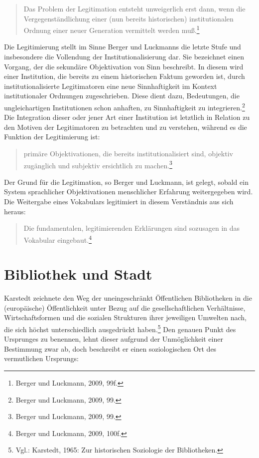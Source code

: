 \documentclass[a4paper,
fontsize=11pt,
oneside,
numbers=noperiodatend,
parskip=half-,
bibliography=totoc,
final
]{scrartcl}
\begin{document}
\begin{quote}
Das Problem der Legitimation entsteht unweigerlich erst dann, wenn die
Vergegenständlichung einer (nun bereits historischen) institutionalen
Ordnung einer neuer Generation vermittelt werden muß.\footnote{Berger
  und Luckmann, 2009, 99f.}
\end{quote}

Die Legitimierung stellt im Sinne Berger und Luckmanns die letzte Stufe
und insbesondere die Vollendung der Institutionalisierung dar. Sie
bezeichnet einen Vorgang, der die sekundäre Objektivation von Sinn
beschreibt. In diesem wird einer Institution, die bereits zu einem
historischen Faktum geworden ist, durch institutionalisierte
Legitimatoren eine neue Sinnhaftigkeit im Kontext institutionaler
Ordnungen zugeschrieben. Diese dient dazu, Bedeutungen, die
ungleichartigen Institutionen schon anhaften, zu Sinnhaftigkeit zu
integrieren.\footnote{Berger und Luckmann, 2009, 99.} Die Integration
dieser oder jener Art einer Institution ist letztlich in Relation zu den
Motiven der Legitimatoren zu betrachten und zu verstehen, während es die
Funktion der Legitimierung ist:

\begin{quote}
primäre Objektivationen, die bereits institutionalisiert sind, objektiv
zugänglich und subjektiv ersichtlich zu machen.\footnote{Berger und
  Luckmann, 2009, 99.}
\end{quote}

Der Grund für die Legitimation, so Berger und Luckmann, ist gelegt,
sobald ein System sprachlicher Objektivationen menschlicher Erfahrung
weitergegeben wird. Die Weitergabe eines Vokabulars legitimiert in
diesem Verständnis aus sich heraus:

\begin{quote}
Die fundamentalen, legitimierenden Erklärungen sind sozusagen in das
Vokabular eingebaut.\footnote{Berger und Luckmann, 2009, 100f.}
\end{quote}

\section*{Bibliothek und Stadt}\label{bibliothek-und-stadt}

Karstedt zeichnete den Weg der uneingeschränkt Öffentlichen Bibliotheken
in die (europäische) Öffentlichkeit unter Bezug auf die
gesellschaftlichen Verhältnisse, Wirtschaftsformen und die sozialen
Strukturen ihrer jeweiligen Umwelten nach, die sich höchst
unterschiedlich ausgedrückt haben.\footnote{Vgl.: Karstedt, 1965: Zur
  historischen Soziologie der Bibliotheken.} Den genauen Punkt des
Ursprunges zu benennen, lehnt dieser aufgrund der Unmöglichkeit einer
Bestimmung zwar ab, doch beschreibt er einen soziologischen Ort des
vermutlichen Ursprungs:
\end{document}
